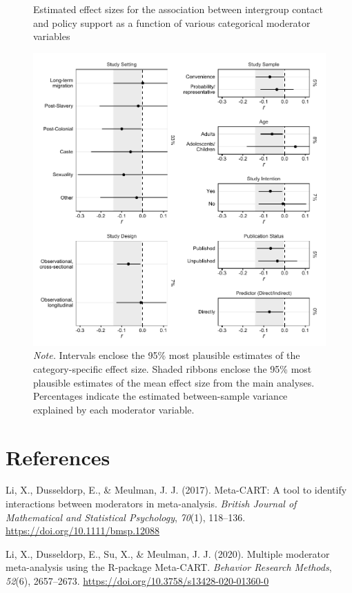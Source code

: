 \documentclass[12pt, letterpaper]{article}
\begin{document}
\begin{figure}
\centering
\caption{Estimated effect sizes for the association between intergroup contact and policy support as a function of various categorical moderator variables}
\includegraphics[scale=1]{../figures/figure-s2}
\caption*{\textit{Note.} Intervals enclose the 95\% most plausible estimates of the category-specific effect size. Shaded ribbons enclose the 95\% most plausible estimates of the mean effect size from the main analyses. Percentages indicate the estimated between-sample variance explained by each moderator variable.}
\label{fig:s2}
\end{figure}

\hypertarget{references}{%
\section{References}\label{references}}

\begingroup

\noindent \setlength{\parindent}{-0.5in} \setlength{\leftskip}{0.5in}

\hypertarget{refs}{}
\leavevmode\hypertarget{ref-li_meta-cart_2017}{}%
Li, X., Dusseldorp, E., \& Meulman, J. J. (2017). Meta-CART: A tool to
identify interactions between moderators in meta-analysis. \emph{British
Journal of Mathematical and Statistical Psychology}, \emph{70}(1),
118--136. \url{https://doi.org/10.1111/bmsp.12088}

\leavevmode\hypertarget{ref-li_multiple_2020}{}%
Li, X., Dusseldorp, E., Su, X., \& Meulman, J. J. (2020). Multiple
moderator meta-analysis using the R-package Meta-CART. \emph{Behavior
Research Methods}, \emph{52}(6), 2657--2673.
\url{https://doi.org/10.3758/s13428-020-01360-0}

\endgroup
\end{document}
